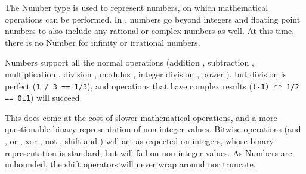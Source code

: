 The Number type is used to represent numbers, on which mathematical
operations can be performed. In \Trilogy{}, numbers go beyond integers
and floating point numbers to also include any rational or complex
numbers as well. At this time, there is no Number for infinity
or irrational numbers.

Numbers support all the normal operations (addition \op{+},
subtraction \op{-}, multiplication \op{*}, division \op{/},
modulus \op{\%}, integer division \op{//}, power \op{**}), but
division is perfect (\texttt{1 / 3 == 1/3}), and operations that
have complex results (\texttt{(-1) ** 1/2 == 0i1}) will succeed.

This does come at the cost of slower mathematical operations, and a
more questionable binary representation of non-integer values. Bitwise
operations (and \op{\&}, or \op{|}, xor \op{\textasciicircum}, not
\op{\textasciitilde}, shift \op{\textasciitilde>} and \op{<\textasciitilde})
will act as expected on integers, whose binary representation is
standard, but will fail on non-integer values. As Numbers are
unbounded, the shift operators will never wrap around nor truncate.
